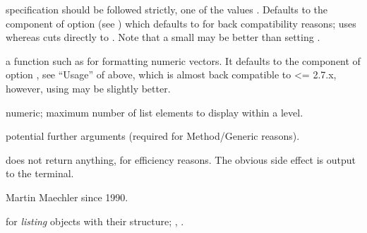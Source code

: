 \begin{Arguments}
\begin{ldescription}
specification should be followed strictly, one of the values
.
Defaults to the  component of option 
(see ) which defaults to  for back
compatibility reasons;  uses
 whereas  cuts
directly to .  Note that a small 
may be better than setting .
\item[\code{formatNum}] a function such as  for
formatting numeric vectors.  It defaults to the 
component of option , see ``Usage'' of
 above, which is almost back compatible to \R{}
<= 2.7.x, however, using  may be slightly better.
\item[\code{list.len}] numeric; maximum number of list elements to display
within a level.
\item[\code{...}] potential further arguments (required for Method/Generic
reasons).
\end{ldescription}
\end{Arguments}
%
\begin{Value}
 does not return anything, for efficiency reasons.
The obvious side effect is output to the terminal.
\end{Value}
%
\begin{Author}\relax
Martin Maechler  since 1990.
\end{Author}
%
\begin{SeeAlso}\relax
{} for \emph{listing} objects with their structure;
, .
\end{SeeAlso}
%
